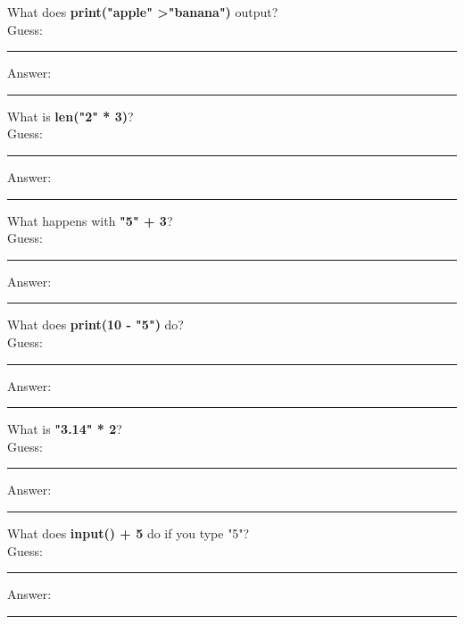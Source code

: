 \documentclass{article}
\begin{document}
\begin{tasks}[
    style=enumerate,
    label-format=\bfseries,
    label-width=1.5em,
    item-indent=2em,
    column-sep=1em,
    after-item-skip=2em
  ]
        \task What does \textbf{print("apple" \textgreater "banana")} output?  \\
        Guess:  \vspace{3mm}\\
        \rule{\linewidth}{0.4pt} %
        Answer:  \vspace{3mm}\\
        \rule{\linewidth}{0.4pt} %

        \task What is \textbf{len("2" * 3)}?  \\
        Guess:  \vspace{3mm}\\
        \rule{\linewidth}{0.4pt} %
        Answer:  \vspace{3mm}\\
        \rule{\linewidth}{0.4pt} %

        \task What happens with \textbf{"5" + 3}?  \\
        Guess:  \vspace{3mm}\\
        \rule{\linewidth}{0.4pt} %
        Answer:  \vspace{3mm}\\
        \rule{\linewidth}{0.4pt} %

        \task What does \textbf{print(10 - "5")} do?  \\
        Guess:  \vspace{3mm}\\
        \rule{\linewidth}{0.4pt} %
        Answer:  \vspace{3mm}\\
        \rule{\linewidth}{0.4pt} %

        \task What is \textbf{"3.14" * 2}?  \\
        Guess:  \vspace{3mm}\\
        \rule{\linewidth}{0.4pt} %
        Answer:  \vspace{3mm}\\
        \rule{\linewidth}{0.4pt} %

        \task What does \textbf{input() + 5} do if you type "5"?  \\
        Guess:  \vspace{3mm}\\
        \rule{\linewidth}{0.4pt} %
        Answer:  \vspace{3mm}\\
        \rule{\linewidth}{0.4pt} %


\end{tasks}
\end{document}
